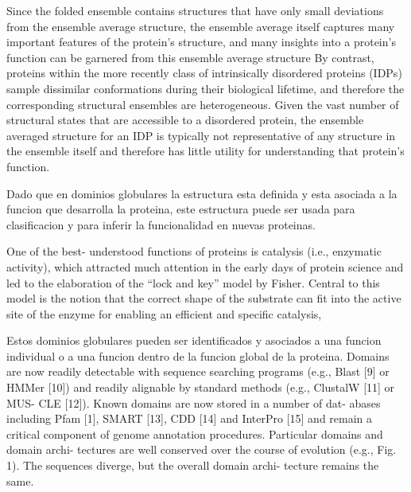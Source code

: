 
Since the folded ensemble contains structures that have only small deviations from the ensemble average
structure, the ensemble average itself captures many important features of the protein's structure, and many insights into a protein's function can be garnered from this
ensemble average structure
By contrast, proteins within the more recently class of intrinsically disordered
proteins (IDPs) sample dissimilar conformations during their biological lifetime, and therefore the corresponding structural
ensembles are heterogeneous.
Given the vast number of structural states that are
accessible to a disordered protein, the ensemble averaged structure for an IDP is typically
not representative of any structure in the ensemble itself and therefore has little utility
for understanding that protein's function.




Dado que en dominios globulares la estructura esta definida y esta asociada a la funcion que desarrolla la proteina, este estructura puede ser usada para clasificacion y para inferir la funcionalidad en nuevas proteinas.


One of the best-
understood functions of proteins is catalysis (i.e., enzymatic
activity), which attracted much attention in the early days of
protein science and led to the elaboration of the “lock and key”
model by Fisher. Central to this model is the notion that the
correct shape of the substrate can fit into the active site of the
enzyme for enabling an efficient and specific catalysis,







Estos dominios globulares pueden ser identificados y asociados a una funcion individual o a una funcion dentro de la funcion global de la proteina.
Domains are now readily detectable with sequence
searching programs (e.g., Blast [9] or HMMer [10]) and readily
alignable by standard methods (e.g., ClustalW [11] or MUS-
CLE [12]). Known domains are now stored in a number of dat-
abases including Pfam [1], SMART [13], CDD [14] and
InterPro [15] and remain a critical component of genome
annotation procedures. Particular domains and domain archi-
tectures are well conserved over the course of evolution (e.g.,
Fig. 1). The sequences diverge, but the overall domain archi-
tecture remains the same.





